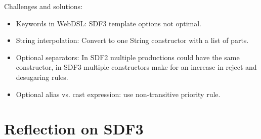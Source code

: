     Challenges and solutions:
    \begin{itemize}
      \item Keywords in WebDSL: SDF3 template options not optimal.
      \item String interpolation: Convert to one String constructor with a list of parts.
      \item Optional separators: In SDF2 multiple productions could have the same constructor, in SDF3 multiple constructors make for an increase in reject and desugaring rules.
      \item Optional alias vs. cast expression: use non-transitive priority rule.
    \end{itemize}

  \section{Reflection on SDF3}
